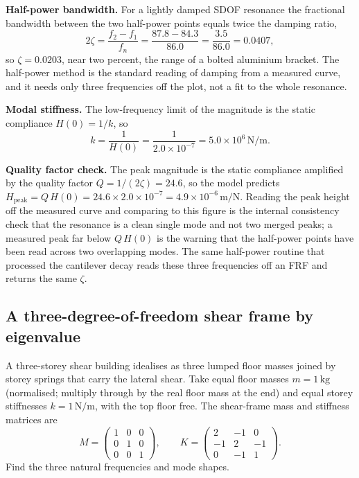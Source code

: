 \textbf{Half-power bandwidth.} For a lightly damped SDOF resonance the
fractional bandwidth between the two half-power points equals twice the
damping ratio,
\[
2\zeta = \frac{f_2 - f_1}{f_n} = \frac{87.8 - 84.3}{86.0} = \frac{3.5}{
86.0} = 0.0407,
\]
so $\zeta = 0.0203$, near two percent, the range of a bolted aluminium
bracket. The half-power method is the standard reading of damping from
a measured curve, and it needs only three frequencies off the plot, not
a fit to the whole resonance.

\textbf{Modal stiffness.} The low-frequency limit of the magnitude is
the static compliance $H(0) = 1/k$, so
\[
k = \frac{1}{H(0)} = \frac{1}{2.0\times 10^{-7}} = 5.0\times 10^6\,\si{
\newton\per\meter}.
\]

\textbf{Quality factor check.} The peak magnitude is the static
compliance amplified by the quality factor $Q = 1/(2\zeta) = 24.6$, so
the model predicts $H_{\text{peak}} = Q\,H(0) = 24.6\times 2.0\times
10^{-7} = 4.9\times 10^{-6}\,\si{\meter\per\newton}$. Reading the peak
height off the measured curve and comparing to this figure is the
internal consistency check that the resonance is a clean single mode and
not two merged peaks; a measured peak far below $Q\,H(0)$ is the warning
that the half-power points have been read across two overlapping modes.
The same  half-power routine that processed the
cantilever decay reads these three frequencies off an FRF and returns
the same $\zeta$.

\subsection{A three-degree-of-freedom shear frame by eigenvalue}

A three-storey shear building idealises as three lumped floor masses
joined by storey springs that carry the lateral shear. Take equal floor
masses $m = 1\,\si{\kilogram}$ (normalised; multiply through by the real
floor mass at the end) and equal storey stiffnesses $k = 1\,\si{\newton
\per\meter}$, with the top floor free. The shear-frame mass and
stiffness matrices are
\[
M = \begin{pmatrix} 1 & 0 & 0 \\ 0 & 1 & 0 \\ 0 & 0 & 1 \end{pmatrix},
\qquad
K = \begin{pmatrix} 2 & -1 & 0 \\ -1 & 2 & -1 \\ 0 & -1 & 1
\end{pmatrix}.
\]
Find the three natural frequencies and mode shapes.

